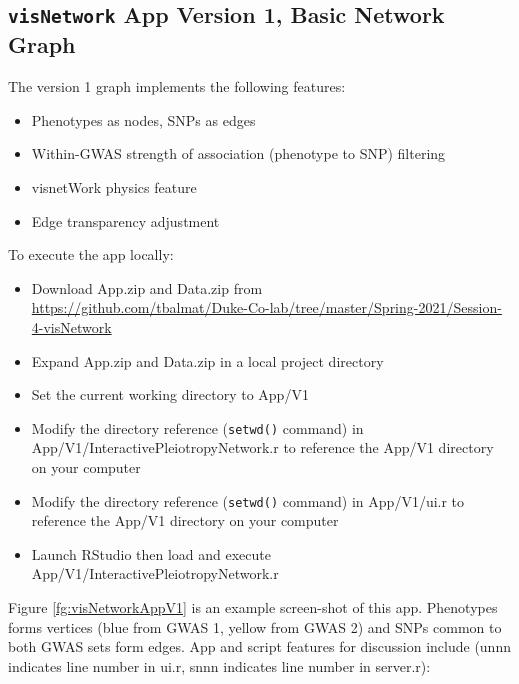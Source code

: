 \documentclass[10pt, letterpaper]{article}
\begin{document}
\begin{spacing}{1.0}
\subsection{\texttt{visNetwork} App Version 1, Basic Network Graph}\label{sec:visNetworkV1}

The version 1 graph implements the following features:

\begin{itemize}[noitemsep]
    \item Phenotypes as nodes, SNPs as edges
    \item Within-GWAS strength of association (phenotype to SNP) filtering
    \item visnetWork physics feature
    \item Edge transparency adjustment
\end{itemize}
    
To execute the app locally:

\begin{itemize}[noitemsep]
    \item Download App.zip and Data.zip from\\ \url{https://github.com/tbalmat/Duke-Co-lab/tree/master/Spring-2021/Session-4-visNetwork}
    \item Expand App.zip and Data.zip in a local project directory
    \item Set the current working directory to App/V1
    \item Modify the directory reference (\texttt{setwd()} command) in App/V1/InteractivePleiotropyNetwork.r to reference the App/V1 directory on your computer
    \item Modify the directory reference (\texttt{setwd()} command) in App/V1/ui.r to reference the App/V1 directory on your computer
    \item Launch RStudio then load and execute App/V1/InteractivePleiotropyNetwork.r
\end{itemize}

Figure \ref{fg:visNetworkAppV1} is an example screen-shot of this app.  Phenotypes forms vertices (blue from GWAS 1, yellow from GWAS 2) and SNPs common to both GWAS sets form edges.  App and script features for discussion include (unnn indicates line number in ui.r, snnn  indicates line number in server.r):


\end{spacing}
\end{document}
